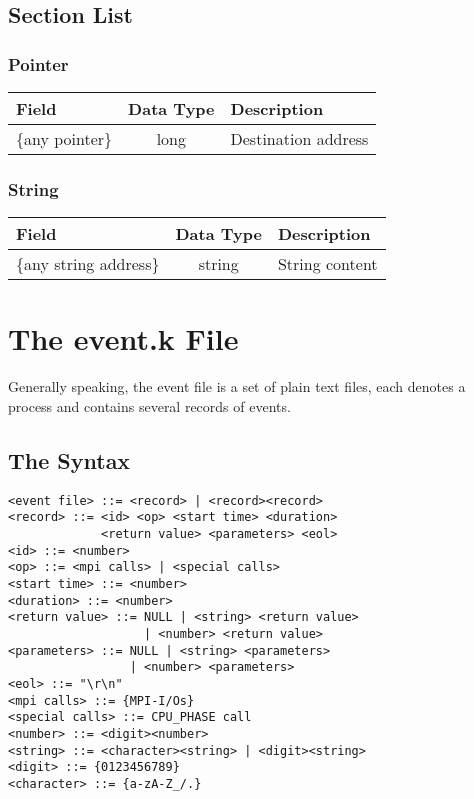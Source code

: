 \documentclass{article}
\begin{document}
\subsection{Section List}
\label{sec:RuntimeSectionList}

\subsubsection{Pointer}
\label{sec:Pointer}
\begin{flushleft}
  \begin{tabular}{l | c | l}
    Field & Data Type & Description\\\hline
    \{any pointer\} & long & Destination address\\
  \end{tabular}
\end{flushleft}

\subsubsection{String}
\label{sec:String}
\begin{flushleft}
  \begin{tabular}{l | c | l}
    Field & Data Type & Description\\\hline
    \{any string address\} & string & String content\\
  \end{tabular}
\end{flushleft}

\section{The event.k File}
\label{sec:TheEventKFile}
Generally speaking, the event file is a set of plain text files, each denotes a process and contains several records of events.
\subsection{The Syntax}
\label{sec:TheSyntax}
\begin{verbatim}
<event file> ::= <record> | <record><record>
<record> ::= <id> <op> <start time> <duration> 
             <return value> <parameters> <eol>
<id> ::= <number>
<op> ::= <mpi calls> | <special calls>
<start time> ::= <number>
<duration> ::= <number>
<return value> ::= NULL | <string> <return value>
                   | <number> <return value>
<parameters> ::= NULL | <string> <parameters> 
                 | <number> <parameters>
<eol> ::= "\r\n"
<mpi calls> ::= {MPI-I/Os}
<special calls> ::= CPU_PHASE call
<number> ::= <digit><number>
<string> ::= <character><string> | <digit><string>
<digit> ::= {0123456789}
<character> ::= {a-zA-Z_/.}
\end{verbatim}
\end{document}
